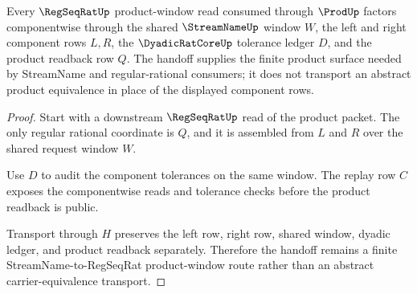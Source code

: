 \begin{theorem}
\label{thm:prod-regseqrat-window-handoff}
Every $\RegSeqRatUp$ product-window read consumed through $\ProdUp$ factors componentwise through the shared $\StreamNameUp$ window $W$, the left and right component rows $L,R$, the $\DyadicRatCoreUp$ tolerance ledger $D$, and the product readback row $Q$. The handoff supplies the finite product surface needed by StreamName and regular-rational consumers; it does not transport an abstract product equivalence in place of the displayed component rows.
\end{theorem}
\begin{proof}
Start with a downstream $\RegSeqRatUp$ read of the product packet. The only regular rational coordinate is $Q$, and it is assembled from $L$ and $R$ over the shared request window $W$.

Use $D$ to audit the component tolerances on the same window. The replay row $C$ exposes the componentwise reads and tolerance checks before the product readback is public.

Transport through $H$ preserves the left row, right row, shared window, dyadic ledger, and product readback separately. Therefore the handoff remains a finite StreamName-to-RegSeqRat product-window route rather than an abstract carrier-equivalence transport.
\end{proof}
